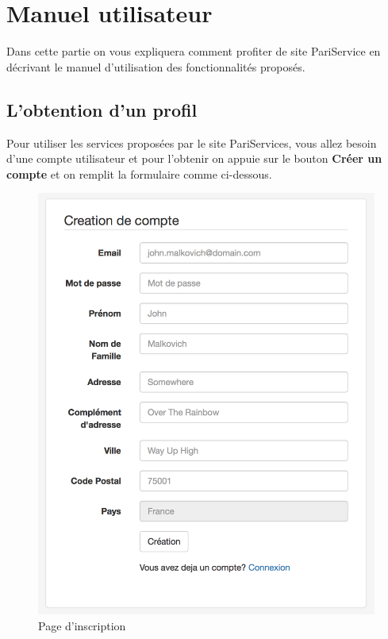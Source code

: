 \section{Manuel utilisateur}
Dans cette partie on vous expliquera comment profiter de site PariService en décrivant le manuel d'utilisation des fonctionnalités proposés. 
\subsection{L'obtention d'un profil}
Pour utiliser les services proposées par le site PariServices, vous allez besoin d'une compte utilisateur et pour l'obtenir on appuie sur le bouton \textbf{Créer un compte} et on remplit la formulaire comme ci-dessous.\newline

\begin{minipage}{0.53\textwidth}
	\begin{figure}[H]
		\includegraphics[width=1\textwidth]{images/manuel/signup}
		\caption{Page d'inscription \label{overflow}}
	\end{figure}
\end{minipage} \hfill
